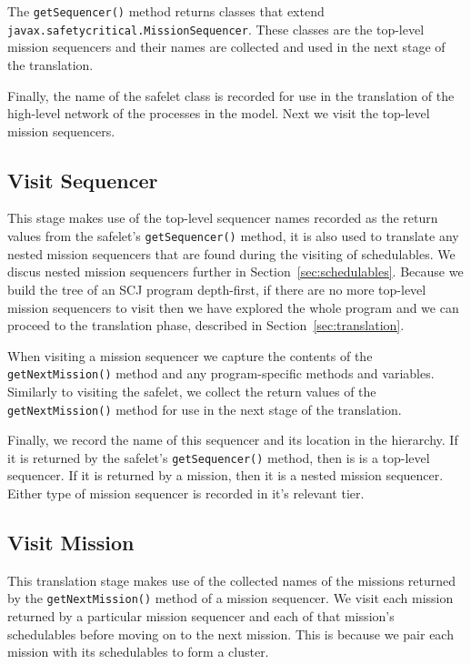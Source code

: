 \documentclass[10pt,a4paper]{article}
\begin{document}
The \texttt{getSequencer()} method returns classes that extend \texttt{javax.safetycritical.MissionSequencer}. These classes are the top-level mission sequencers and their names are collected and used in the next stage of the translation. 

Finally, the name of the safelet class is recorded for use in the translation of the high-level network of the processes in the model. Next we visit the top-level mission sequencers.

\subsection{Visit Sequencer}
\label{sec:sequencer}
This stage makes use of the top-level sequencer names recorded as the return values from the safelet's \texttt{getSequencer()} method, it is also used to translate any nested mission sequencers that are found during the visiting of schedulables. We discus nested mission sequencers further in Section~\ref{sec:schedulables}. Because we build the tree of an SCJ program depth-first, if there are no more top-level mission sequencers to visit then we have explored the whole program and we can proceed to the translation phase, described in Section~\ref{sec:translation}.

When visiting a mission sequencer we capture the contents of the \texttt{getNextMission()} method and any program-specific methods and variables. Similarly to visiting the safelet, we collect the return values of the \texttt{getNextMission()} method for use in the next stage of the translation. 

Finally, we record the name of this sequencer and its location in the hierarchy. If it is returned by the safelet's \texttt{getSequencer()} method, then is is a top-level sequencer. If it is returned by a mission, then it is a nested mission sequencer. Either type of mission sequencer is recorded in it's relevant tier.

\subsection{Visit Mission}

This translation stage makes use of the collected names of the missions returned by the \texttt{getNextMission()} method of a mission sequencer. We visit each mission returned by a particular mission sequencer and each of that mission's schedulables before moving on to the next mission. This is because we pair each mission with its schedulables to form a cluster. 
\end{document}
